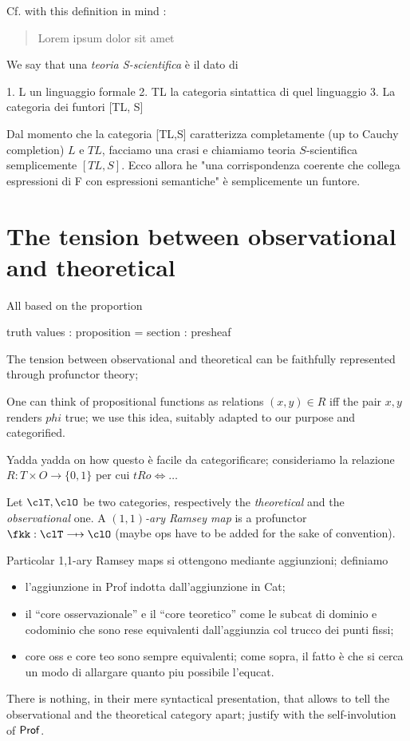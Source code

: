 \documentclass[a4paper]{../birkjour}
\begin{document}
Cf. with this definition in mind \cite{biologia}:
\begin{quote}
  Lorem ipsum dolor sit amet
\end{quote}
We say that una \emph{teoria S-scientifica} è il dato di

1. L un linguaggio formale
2. TL la categoria sintattica di quel linguaggio
3. La categoria dei funtori [TL, S]

Dal momento che la categoria [TL,S] caratterizza completamente (up to Cauchy completion) $L$ e $TL$, facciamo una crasi e chiamiamo teoria $S$-scientifica semplicemente $[TL,S]$. Ecco allora he "una corrispondenza coerente che collega espressioni di F con espressioni semantiche" è semplicemente un funtore.
\section{The tension between observational and theoretical}
\label{sec:orge11c3c4}
All based on the proportion

truth values : proposition = section : presheaf

The tension between observational and theoretical can be faithfully represented through profunctor theory;
\begin{remark}
  One can think of propositional functions as relations $(x,y)\in R$ iff the pair $x,y$ renders $phi$ true; we use this idea, suitably adapted to our purpose and categorified.
\end{remark}
Yadda yadda on how questo è facile da categorificare; consideriamo la relazione $R : T \times O \to \{0,1\}$ per cui $tRo \iff \dots$
\begin{definition}
  Let $\clT,\clO$ be two categories, respectively the \emph{theoretical} and the \emph{observational} one. A \emph{$(1,1)$-ary Ramsey map} is a profunctor $\fkk : \clT \pto \clO$ (maybe ops have to be added for the sake of convention).
\end{definition}
\begin{remark}
  Particolar 1,1-ary Ramsey maps si ottengono mediante aggiunzioni; definiamo
  \begin{itemize}
    \item l'aggiunzione in Prof indotta dall'aggiunzione in Cat;
    \item il ``core osservazionale'' e il ``core teoretico'' come le subcat di dominio e codominio che sono rese equivalenti dall'aggiunzia col trucco dei punti fissi;
    \item core oss e core teo sono sempre equivalenti; come sopra, il fatto è che si cerca un modo di allargare quanto piu possibile l'equcat.
  \end{itemize}
\end{remark}
There is nothing, in their mere syntactical presentation, that allows to tell the observational and the theoretical category apart; justify with the self-involution of $\mathsf{Prof}$.
\end{document}
